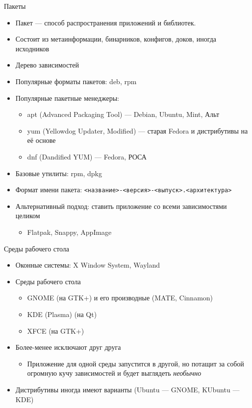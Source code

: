 \documentclass{../../slides-style}
\begin{document}
    \begin{frame}{Пакеты}
        \begin{itemize}
            \item Пакет --- способ распространения приложений и библиотек. 
            \item Состоит из метаинформации, бинарников, конфигов, доков, иногда исходников
            \item Дерево зависимостей
            \item Популярные форматы пакетов: deb, rpm
            \item Популярные пакетные менеджеры: 
            \begin{itemize}
                \item apt (Advanced Packaging Tool) --- Debian, Ubuntu, Mint, Альт
                \item yum (Yellowdog Updater, Modified) --- старая Fedora и дистрибутивы на её основе
                \item dnf (Dandified YUM) --- Fedora, РОСА
            \end{itemize}
            \item Базовые утилиты: rpm, dpkg
            \item Формат имени пакета: \texttt{<название>-<версия>-<выпуск>.<архитектура>}
            \item Альтернативный подход: ставить приложение со всеми зависимостями целиком
            \begin{itemize}
                \item Flatpak, Snappy, AppImage
            \end{itemize}
        \end{itemize}
    \end{frame}

    \begin{frame}{Среды рабочего стола}
        \begin{itemize}
            \item Оконные системы: X Window System, Wayland
            \item Среды рабочего стола
            \begin{itemize}
                \item GNOME (на GTK+) и его производные (MATE, Cinnamon)
                \item KDE (Plasma) (на Qt)
                \item XFCE (на GTK+)
            \end{itemize}
            \item Более-менее исключают друг друга
            \begin{itemize}
                \item Приложение для одной среды запустится в другой, но потащит за собой огромную кучу зависимостей и будет выглядеть \emph{необычно}
            \end{itemize}
            \item Дистрибутивы иногда имеют варианты (Ubuntu --- GNOME, KUbuntu --- KDE)
        \end{itemize}
    \end{frame}
\end{document}
